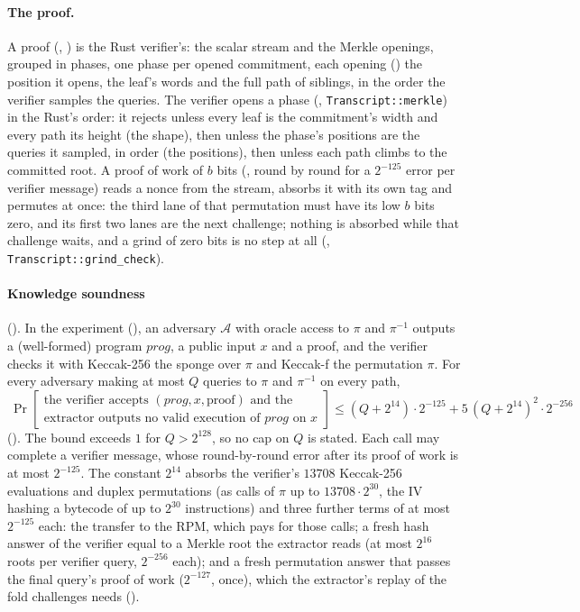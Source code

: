 \documentclass[11pt]{article}
\begin{document}
\paragraph{The proof.} A proof (, ) is the Rust
verifier's: the scalar stream and the Merkle openings, grouped in phases, one phase per opened
commitment, each opening () the position it opens, the leaf's words and the full path
of siblings, in the order the verifier samples the queries. The verifier opens a phase
(, \texttt{Transcript::merkle}) in the Rust's order: it rejects unless every leaf is
the commitment's width and every path its height (the shape), then unless the phase's positions are
the queries it sampled, in order (the positions), then unless each path climbs to the committed
root. A proof of work of $b$ bits (, round by round for a $2^{-125}$ error per
verifier message) reads a nonce from the stream, absorbs it with its own tag and permutes at once:
the third lane of that permutation must have its low $b$ bits zero, and its first two lanes are the
next challenge; nothing is absorbed while that challenge waits, and a grind of zero bits is no step
at all (, \texttt{Transcript::grind\_check}).



\paragraph{Knowledge soundness} (). In the experiment
(), an adversary $\mathcal{A}$ with oracle access to $\pi$ and
$\pi^{-1}$ outputs a (well-formed) program $\mathit{prog}$, a public input $x$ and a proof, and the verifier
checks it with Keccak-256 the sponge over $\pi$ and Keccak-f the permutation $\pi$. For every
adversary making at most $Q$ queries to $\pi$ and $\pi^{-1}$ on every path,
\[
\boxed{\ \Pr\left[\begin{array}{l}\text{the verifier accepts } (\mathit{prog},x,\text{proof}) \text{ and the}\\
\text{extractor outputs no valid execution of } \mathit{prog} \text{ on } x\end{array}\right]
\le (Q+2^{14})\cdot 2^{-125} + 5\,(Q+2^{14})^2\cdot 2^{-256}\ }
\]
(). The bound exceeds $1$ for $Q > 2^{128}$, so no cap on $Q$ is stated. Each call may complete a verifier message, whose
round-by-round error after its proof of work is at most $2^{-125}$. The constant $2^{14}$ absorbs
the verifier's $13708$ Keccak-256 evaluations and duplex permutations (as calls of $\pi$ up to
$13708\cdot 2^{30}$, the IV hashing a bytecode of up to $2^{30}$ instructions) and three further terms
of at most $2^{-125}$ each: the transfer to the RPM, which pays for those calls; a fresh hash answer of
the verifier equal to a Merkle root the extractor reads (at most $2^{16}$ roots per verifier query,
$2^{-256}$ each); and a fresh permutation answer that passes the final query's proof of work
($2^{-127}$, once), which the extractor's replay of the fold challenges needs
().
\end{document}
